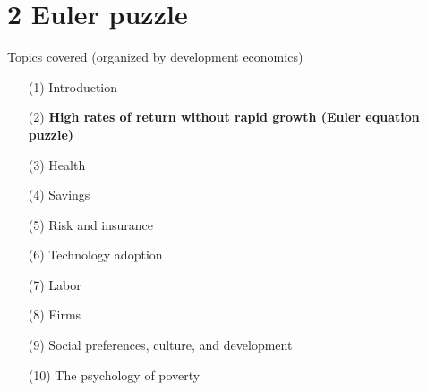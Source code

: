 \documentclass[aspectratio=169, 10pt, handout]{beamer}
\begin{document}
\section{2 Euler puzzle}


\begin{frame}{Topics covered (organized by development economics)}

\begin{enumerate}[(1)]

	\small

	\item[(1)] Introduction 
	
	\item[(2)] \textbf{High rates of return without rapid growth (Euler equation puzzle)}


	\item[(3)] Health
	
	\item[(4)] Savings
	
	\item[(5)] Risk and insurance

	\item[(6)] Technology adoption
	
	\item[(7)] Labor

	\item[(8)] Firms
	
	\item[(9)] Social preferences, culture, and development
	
	\item[(10)] The psychology of poverty

\end{enumerate}

\end{frame}
\end{document}
